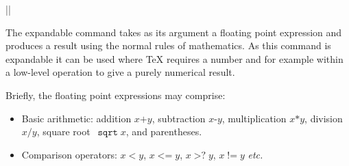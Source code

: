 \documentclass{ltxguide}
\providecommand\fpop[1]{\mathop{\texttt{#1}}}
\providecommand\fpbin[1]{\mathbin{\texttt{#1}}}
\providecommand\fprel[1]{\mathrel{\texttt{#1}}}
\begin{document}
\begin{decl}
  |\fpeval| 
\end{decl}

The expandable command  takes as its argument a floating
point expression and produces a result using the normal rules of
mathematics. As this command is expandable it can be used where \TeX{}
requires a number and for example within a low-level  operation
to give a purely numerical result.



Briefly, the floating point expressions may comprise:
\begin{itemize}
  \item Basic arithmetic: addition $x\fpbin{+}y$, subtraction $x\fpbin{-}y$,
    multiplication $x\fpbin{*}y$, division $x\fpbin{/}y$, square root~$\fpop{sqrt}{x}$,
    and parentheses.
  \item Comparison operators: $x\fprel{<}y$,
    $x\fprel{<=}y$, $x\fprel{>?}y$,
    $x\fprel{!=}y$ \emph{etc.}
    

\end{itemize}
\end{document}
